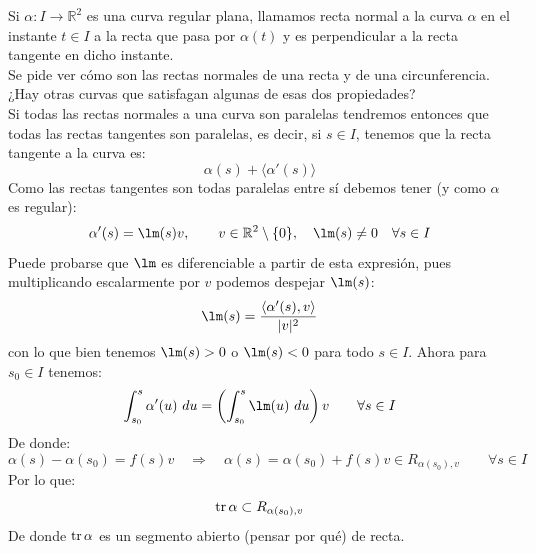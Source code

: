\begin{ejercicio}
    Si $\alpha:I\to \mathbb{R}^2$ es una curva regular plana, llamamos recta normal a la curva $\alpha$ en el instante $t\in I$ a la recta que pasa por $\alpha(t)$ y es perpendicular a la recta tangente en dicho instante.\\

    \noindent
    Se pide ver cómo son las rectas normales de una recta y de una circunferencia. ¿Hay otras curvas que satisfagan algunas de esas dos propiedades?\\

    \noindent
    Si todas las rectas normales a una curva son paralelas tendremos entonces que todas las rectas tangentes son paralelas, es decir, si $s\in I$, tenemos que la recta tangente a la curva es:
    \begin{equation*}
        \alpha(s) + \langle \alpha'(s) \rangle 
    \end{equation*}
    Como las rectas tangentes son todas paralelas entre sí debemos tener (y como $\alpha$ es regular):
    \begin{equation*}
        \alpha'(s) = \lm(s)v, \qquad v\in \mathbb{R}^2\setminus \{0\}, \quad \lm(s) \neq 0\quad \forall s\in I
    \end{equation*}
    Puede probarse que $\lm$ es diferenciable a partir de esta expresión, pues multiplicando escalarmente por $v$ podemos despejar $\lm(s)$:
    \begin{equation*}
        \lm(s) = \frac{\langle \alpha'(s),v \rangle }{|v|^2}
    \end{equation*}
    con lo que bien tenemos $\lm(s)> 0 $ o $\lm(s)<0$ para todo $s\in I$. Ahora para $s_0\in I$ tenemos:
    \begin{equation*}
        \int_{s_0}^{s} \alpha'(u)~du = \left(\int_{s_0}^{s} \lm(u)~du \right)v\qquad \forall s\in I
    \end{equation*}
    De donde:
    \begin{equation*}
        \alpha(s) - \alpha(s_0) = f(s)v \quad\Longrightarrow\quad \alpha(s) = \alpha(s_0) + f(s)v \in R_{\alpha(s_0),v} \qquad \forall s\in I
    \end{equation*}
    Por lo que:
    \begin{equation*}
        \operatorname{tr}\alpha\subset R_{\alpha(s_0),v}
    \end{equation*}
    De donde $\operatorname{tr}\alpha$ es un segmento abierto (pensar por qué) de recta.\\


\end{ejercicio}
